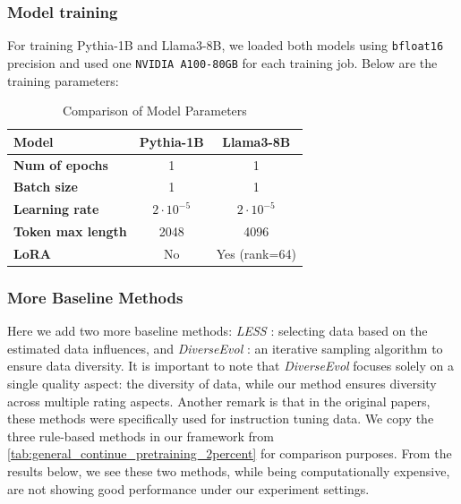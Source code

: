 \documentclass{article}
\newcommand{\mytiny}{\fontsize{8pt}{10pt}\selectfont}
\begin{document}
\subsubsection{Model training}\label{subsub:Appendix-EvalB-model_training}
For training Pythia-1B and Llama3-8B, we loaded both models using \texttt{bfloat16} precision and used one \texttt{NVIDIA A100-80GB} for each training job. Below are the training parameters:
\begin{table}[h]
\centering
\mytiny
\caption{Comparison of Model Parameters}
\label{tab:Appendix-EvalB-training}
\begin{tabular}{l|c|c}  %
\hline  %
\textbf{Model}      & Pythia-1B & Llama3-8B \\
\hline  %
\textbf{Num of epochs}           & 1                  & 1                  \\
\hline  %
\textbf{Batch size}              & 1                  & 1                  \\
\hline
\textbf{Learning rate}           & $2\cdot 10^{-5}$   & $2\cdot 10^{-5}$   \\
\hline
\textbf{Token max length}        & 2048               & 4096               \\
\hline
\textbf{LoRA}                    & No                 & Yes (rank=64)      \\
\hline  %
\end{tabular}
\end{table}


\subsubsection{More Baseline Methods}\label{subsec:MoreBaseline}
Here we add two more baseline methods: \textit{LESS} \citep{xia2024less}: selecting data based on the estimated data influences, and \textit{DiverseEvol} \citep{wu2023self}: an iterative sampling algorithm to ensure data diversity. It is important to note that \textit{DiverseEvol} focuses solely on a single quality aspect: the diversity of data, while our method ensures diversity across multiple rating aspects. Another remark is that in the original papers, these methods were specifically used for instruction tuning data. We copy the three rule-based methods in our framework from \ref{tab:general_continue_pretraining_2percent} for comparison purposes. From the results below, we see these two methods, while being computationally expensive, are not showing good performance under our experiment settings.
\end{document}
